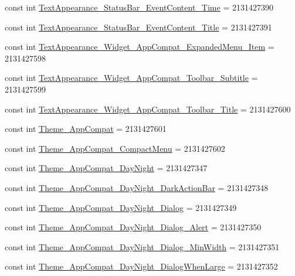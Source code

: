 \begin{CompactItemize}
\item 
const int \hyperlink{class__2doo_1_1_droid_1_1_resource_1_1_style_bf62a65e653e71103c0e622ad92deaaa}{TextAppearance\_\-StatusBar\_\-EventContent\_\-Time} = 2131427390
\item 
const int \hyperlink{class__2doo_1_1_droid_1_1_resource_1_1_style_6e575795652b5d31f1f33ca4e15747ef}{TextAppearance\_\-StatusBar\_\-EventContent\_\-Title} = 2131427391
\item 
const int \hyperlink{class__2doo_1_1_droid_1_1_resource_1_1_style_0198ab3d3f0e8f952f3a62ea0d497a9e}{TextAppearance\_\-Widget\_\-AppCompat\_\-ExpandedMenu\_\-Item} = 2131427598
\item 
const int \hyperlink{class__2doo_1_1_droid_1_1_resource_1_1_style_0aeab9c8b04dcf5f36355cc4f2a47826}{TextAppearance\_\-Widget\_\-AppCompat\_\-Toolbar\_\-Subtitle} = 2131427599
\item 
const int \hyperlink{class__2doo_1_1_droid_1_1_resource_1_1_style_ca329dab6a641cfcf205df303a204085}{TextAppearance\_\-Widget\_\-AppCompat\_\-Toolbar\_\-Title} = 2131427600
\item 
const int \hyperlink{class__2doo_1_1_droid_1_1_resource_1_1_style_91864b6bc986ee83734f2d314d0946cc}{Theme\_\-AppCompat} = 2131427601
\item 
const int \hyperlink{class__2doo_1_1_droid_1_1_resource_1_1_style_2695104d31f14972fed57aaaf91b1a99}{Theme\_\-AppCompat\_\-CompactMenu} = 2131427602
\item 
const int \hyperlink{class__2doo_1_1_droid_1_1_resource_1_1_style_9641de03e55ae5c644f9e11ca88cc72c}{Theme\_\-AppCompat\_\-DayNight} = 2131427347
\item 
const int \hyperlink{class__2doo_1_1_droid_1_1_resource_1_1_style_a2a00bc7b833e9a8419ac67122bf11eb}{Theme\_\-AppCompat\_\-DayNight\_\-DarkActionBar} = 2131427348
\item 
const int \hyperlink{class__2doo_1_1_droid_1_1_resource_1_1_style_645059d8fa29d9ceafa08748e14f1351}{Theme\_\-AppCompat\_\-DayNight\_\-Dialog} = 2131427349
\item 
const int \hyperlink{class__2doo_1_1_droid_1_1_resource_1_1_style_268a1750d6e8014833d487d84649f5b0}{Theme\_\-AppCompat\_\-DayNight\_\-Dialog\_\-Alert} = 2131427350
\item 
const int \hyperlink{class__2doo_1_1_droid_1_1_resource_1_1_style_6dc7b946311ff0ed1617ec99f4079187}{Theme\_\-AppCompat\_\-DayNight\_\-Dialog\_\-MinWidth} = 2131427351
\item 
const int \hyperlink{class__2doo_1_1_droid_1_1_resource_1_1_style_62139f990d24ac51ec88b2892d984b23}{Theme\_\-AppCompat\_\-DayNight\_\-DialogWhenLarge} = 2131427352

\end{CompactItemize}
